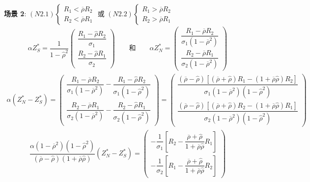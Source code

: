 \documentclass[10.0pt]{article}
\begin{document}
{\bf 场景 2}: $ (N2.1) \left\{ \begin{matrix} R_1 < \overline{\rho} R_2 \\ R_2 < \overline{\rho} R_1 \end{matrix} \right. $ 或 $ (N2.2) \left\{ \begin{matrix} R_1 > \overline{\rho} R_2 \\ R_2 > \overline{\rho} R_1 \end{matrix} \right. $
\begin{eqnarray*}
\alpha Z_S^* = \dfrac1{1 - {\hat \rho}^2} \left( \begin{matrix} \dfrac{R_1 - {\hat \rho} R_2}{\sigma_1} \\ \dfrac{R_2 - {\hat \rho} R_1}{\sigma_2} \end{matrix} \right) \qquad \text{和} \qquad \alpha Z_N^* = \left( \begin{matrix} \dfrac{R_1 - \overline{\rho} R_2}{\sigma_1 (1 - \overline{\rho}^2)} \\ \dfrac{R_2 - \overline{\rho} R_1}{\sigma_2 (1 - \overline{\rho}^2)} \end{matrix} \right)
\end{eqnarray*}
\begin{eqnarray*}
\alpha (Z_N^* - Z_S^*) = \left( \begin{matrix} \dfrac{R_1 - \overline{\rho} R_2}{\sigma_1 (1 - \overline{\rho}^2)} - \dfrac{R_1 - {\hat \rho} R_2}{\sigma_1 (1 - {\hat \rho}^2)} \\ \dfrac{R_2 - \overline{\rho} R_1}{\sigma_2 (1 - \overline{\rho}^2)} - \dfrac{R_2 - {\hat \rho} R_1}{\sigma_2 (1 - {\hat \rho}^2)} \end{matrix} \right) = \left( \begin{matrix} \dfrac{(\overline{\rho} - {\hat \rho}) [(\overline{\rho} + {\hat \rho}) R_1 - (1 + \overline{\rho} {\hat \rho}) R_2]}{\sigma_1 (1 - \overline{\rho}^2) (1 - {\hat \rho}^2)} \\ \dfrac{(\overline{\rho} - {\hat \rho}) [(\overline{\rho} + {\hat \rho}) R_2 - (1 + \overline{\rho} {\hat \rho}) R_1]}{\sigma_2 (1 - \overline{\rho}^2) (1 - {\hat \rho}^2)} \end{matrix} \right)
\end{eqnarray*}
\begin{eqnarray*}
\dfrac{\alpha (1 - \overline{\rho}^2) (1 - {\hat \rho}^2)}{(\overline{\rho} - {\hat \rho}) (1 + \overline{\rho} {\hat \rho})} (Z_N^* - Z_S^*) = \left( \begin{matrix} - \dfrac{1}{\sigma_1} \left[ R_2 - \dfrac{\overline{\rho} + {\hat \rho}}{1 + \overline{\rho} {\hat \rho}} R_1 \right] \\ - \dfrac{1}{\sigma_2} \left[ R_1 - \dfrac{\overline{\rho} + {\hat \rho}}{1 + \overline{\rho} {\hat \rho}} R_2 \right] \end{matrix} \right)
\end{eqnarray*}
\end{document}
